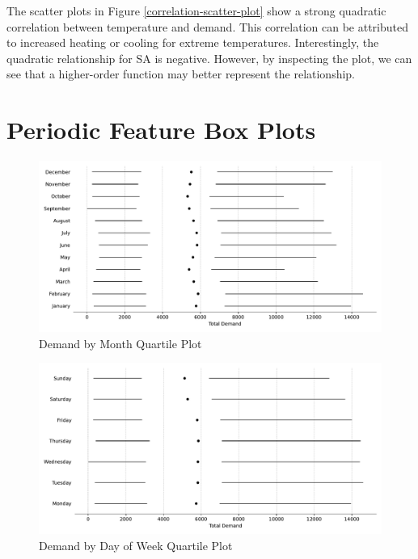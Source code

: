 \documentclass[mstat,12pt]{unswthesis}
\begin{document}
The scatter plots in Figure \ref{correlation-scatter-plot} show a strong quadratic correlation between temperature and demand. This correlation can be attributed to increased heating or cooling for extreme temperatures. Interestingly, the quadratic relationship for SA is negative. However, by inspecting the plot, we can see that a higher-order function may better represent the relationship.

\hypertarget{periodic-box-plots}{%
\section{Periodic Feature Box Plots}\label{periodic-box-plots}}

\begin{figure}[H]
\centerline{\includegraphics[width=\columnwidth]{Final Report/Figures/Plots/tufte_plot_month.pdf}}
\caption{Demand by Month Quartile Plot}
\label{tufte-plot-month}
\end{figure}

\begin{figure}[H]
\centerline{\includegraphics[width=\columnwidth]{Final Report/Figures/Plots/tufte_plot_day_of_week.pdf}}
\caption{Demand by Day of Week Quartile Plot}
\label{tufte-plot-weekday}
\end{figure}
\end{document}
